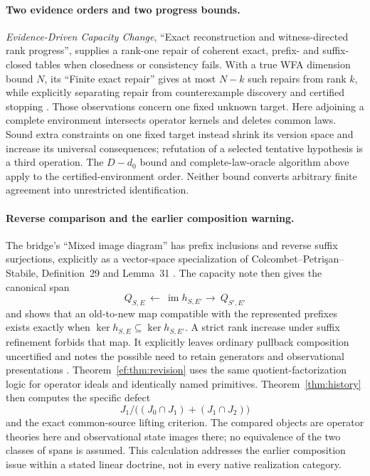 \documentclass[11pt]{article}
\theoremstyle{definition}
\theoremstyle{remark}\newtheorem{remark}[theorem]{Remark}
\newcommand{\im}{\operatorname{im}}
\begin{document}
\paragraph{Two evidence orders and two progress bounds.}
\emph{Evidence-Driven Capacity Change}, ``Exact reconstruction and
witness-directed rank progress'', supplies a rank-one repair of coherent
exact, prefix- and suffix-closed tables when closedness or consistency
fails. With a true WFA dimension bound $N$, its
``Finite exact repair'' gives at most $N-k$ such repairs from rank $k$,
while explicitly separating repair from counterexample discovery and
certified stopping \cite{capacity-note}. Those observations concern one
fixed unknown target. Here adjoining a complete environment intersects
operator kernels and deletes common laws. Sound extra constraints on one
fixed target instead shrink its version space and increase its universal
consequences; refutation of a selected tentative hypothesis is a third
operation. The $D-d_0$ bound and complete-law-oracle algorithm above apply
to the certified-environment order. Neither bound converts arbitrary finite
agreement into unrestricted identification.

\paragraph{Reverse comparison and the earlier composition warning.}
The bridge's ``Mixed image diagram'' has prefix inclusions and reverse
suffix surjections, explicitly as a vector-space specialization of
Colcombet--Petri\c{s}an--Stabile, Definition~29 and Lemma~31
\cite{bridge-note,funl}. The capacity note then gives the canonical span
\[
 Q_{S,E}\ \longleftarrow\ \im h_{S,E'}
 \longrightarrow\ Q_{S',E'}
\]
and shows that an old-to-new map compatible with the represented prefixes
exists exactly when
$\ker h_{S,E}\subseteq\ker h_{S,E'}$. A strict rank increase under suffix
refinement forbids that map. It explicitly leaves ordinary pullback
composition uncertified and notes the possible need to retain generators
and observational presentations \cite{capacity-note}.
Theorem~\ref{ef:thm:revision} uses the same quotient-factorization logic
for operator ideals and identically named primitives. Theorem~\ref{thm:history}
then computes the specific defect
\[
 J_1/\bigl((J_0\cap J_1)+(J_1\cap J_2)\bigr)
\]
and the exact common-source lifting criterion. The compared objects are
operator theories here and observational state images there; no equivalence
of the two classes of spans is assumed. This calculation addresses the
earlier composition issue within a stated linear doctrine, not in every
native realization category.
\end{document}
